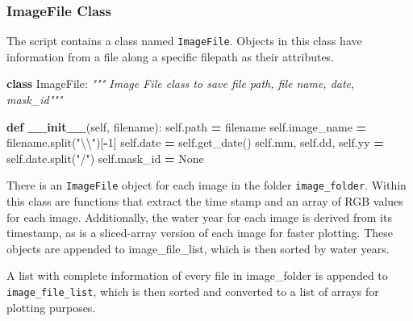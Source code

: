 \documentclass[
]{article}
\newenvironment{Shaded}{\begin{snugshade}}{\end{snugshade}}
\newcommand{\CharTok}[1]{\textcolor[rgb]{0.31,0.60,0.02}{#1}}
\newcommand{\CommentTok}[1]{\textcolor[rgb]{0.56,0.35,0.01}{\textit{#1}}}
\newcommand{\DecValTok}[1]{\textcolor[rgb]{0.00,0.00,0.81}{#1}}
\newcommand{\FunctionTok}[1]{\textcolor[rgb]{0.13,0.29,0.53}{\textbf{#1}}}
\newcommand{\KeywordTok}[1]{\textcolor[rgb]{0.13,0.29,0.53}{\textbf{#1}}}
\newcommand{\NormalTok}[1]{#1}
\newcommand{\OperatorTok}[1]{\textcolor[rgb]{0.81,0.36,0.00}{\textbf{#1}}}
\newcommand{\StringTok}[1]{\textcolor[rgb]{0.31,0.60,0.02}{#1}}
\newcommand{\VariableTok}[1]{\textcolor[rgb]{0.00,0.00,0.00}{#1}}
\begin{document}
\hypertarget{imagefile-class}{%
\subsubsection{ImageFile Class}\label{imagefile-class}}

The script contains a class named \texttt{ImageFile}. Objects in this class have information
from a file along a specific filepath as their attributes.

\begin{Shaded}
\begin{Highlighting}[]
\KeywordTok{class}\NormalTok{ ImageFile:}
    \CommentTok{""" Image File class to save file path, file name, date, mask\_id"""}

    \KeywordTok{def} \FunctionTok{\_\_init\_\_}\NormalTok{(}\VariableTok{self}\NormalTok{, filename):}
        \VariableTok{self}\NormalTok{.path }\OperatorTok{=}\NormalTok{ filename}
        \VariableTok{self}\NormalTok{.image\_name }\OperatorTok{=}\NormalTok{ filename.split(}\StringTok{"}\CharTok{\textbackslash{}\textbackslash{}}\StringTok{"}\NormalTok{)[}\OperatorTok{{-}}\DecValTok{1}\NormalTok{]}
        \VariableTok{self}\NormalTok{.date }\OperatorTok{=} \VariableTok{self}\NormalTok{.get\_date()}
        \VariableTok{self}\NormalTok{.mm, }\VariableTok{self}\NormalTok{.dd, }\VariableTok{self}\NormalTok{.yy }\OperatorTok{=} \VariableTok{self}\NormalTok{.date.split(}\StringTok{"/"}\NormalTok{)}
        \VariableTok{self}\NormalTok{.mask\_id }\OperatorTok{=} \VariableTok{None}
\end{Highlighting}
\end{Shaded}

There is an \texttt{ImageFile} object for each image in the folder \texttt{image\_folder}. Within this class are functions that extract the time stamp and an array of RGB values for each image. Additionally, the water year for each image is derived from its timestamp, as is a sliced-array version of each image for faster plotting. These objects are appended to image\_file\_list, which is then sorted by water years.

A list with complete information of every file in image\_folder is appended to \texttt{image\_file\_list}, which is then sorted and converted to a list of arrays for plotting purposes.
\end{document}
